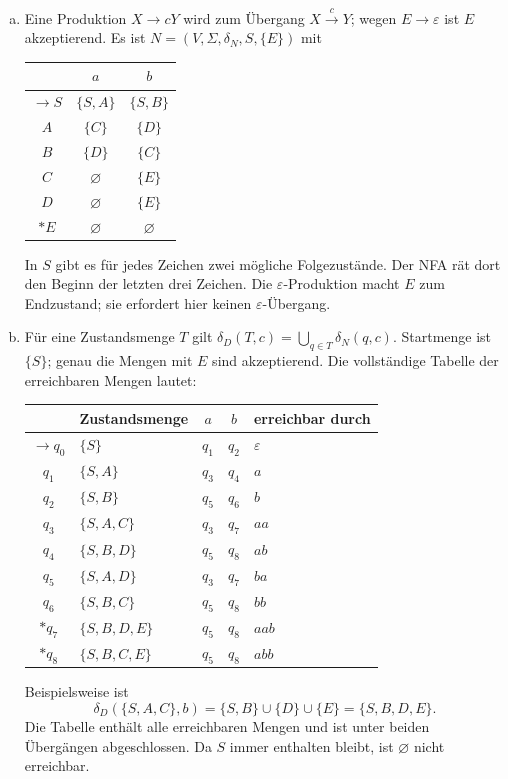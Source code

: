 \begin{loesung}
\begin{enumerate}[a)]
\item Eine Produktion $X\to cY$ wird zum Übergang $X\xrightarrow{c}Y$;
wegen $E\to\varepsilon$ ist $E$ akzeptierend. Es ist
$N=(V,\Sigma,\delta_N,S,\{E\})$ mit
\begin{center}
\begin{tabular}{c|cc}
 & $a$ & $b$\\\hline
$\to S$ & $\{S,A\}$ & $\{S,B\}$\\
$A$ & $\{C\}$ & $\{D\}$\\
$B$ & $\{D\}$ & $\{C\}$\\
$C$ & $\varnothing$ & $\{E\}$\\
$D$ & $\varnothing$ & $\{E\}$\\
$*E$ & $\varnothing$ & $\varnothing$
\end{tabular}
\end{center}
In $S$ gibt es für jedes Zeichen zwei mögliche Folgezustände.
Der NFA rät dort den Beginn der letzten drei Zeichen.
Die $\varepsilon$-Produktion macht $E$ zum Endzustand; sie erfordert hier
keinen $\varepsilon$-Übergang.

\newpage
\item Für eine Zustandsmenge $T$ gilt
$\delta_D(T,c)=\bigcup_{q\in T}\delta_N(q,c)$.
Startmenge ist $\{S\}$; genau die Mengen mit $E$ sind akzeptierend.
Die vollständige Tabelle der erreichbaren Mengen lautet:
\begin{center}
\begin{tabular}{c|l|cc|l}
 & Zustandsmenge & $a$ & $b$ & erreichbar durch\\\hline
$\to q_0$ & $\{S\}$ & $q_1$ & $q_2$ & $\varepsilon$\\
$q_1$ & $\{S,A\}$ & $q_3$ & $q_4$ & $a$\\
$q_2$ & $\{S,B\}$ & $q_5$ & $q_6$ & $b$\\
$q_3$ & $\{S,A,C\}$ & $q_3$ & $q_7$ & $aa$\\
$q_4$ & $\{S,B,D\}$ & $q_5$ & $q_8$ & $ab$\\
$q_5$ & $\{S,A,D\}$ & $q_3$ & $q_7$ & $ba$\\
$q_6$ & $\{S,B,C\}$ & $q_5$ & $q_8$ & $bb$\\
$*q_7$ & $\{S,B,D,E\}$ & $q_5$ & $q_8$ & $aab$\\
$*q_8$ & $\{S,B,C,E\}$ & $q_5$ & $q_8$ & $abb$
\end{tabular}
\end{center}
Beispielsweise ist
\[
\delta_D(\{S,A,C\},b)
=\{S,B\}\cup\{D\}\cup\{E\}=\{S,B,D,E\}.
\]
Die Tabelle enthält alle erreichbaren Mengen und ist unter beiden Übergängen
abgeschlossen. Da $S$ immer enthalten bleibt, ist $\varnothing$ nicht erreichbar.


\end{enumerate}
\end{loesung}
